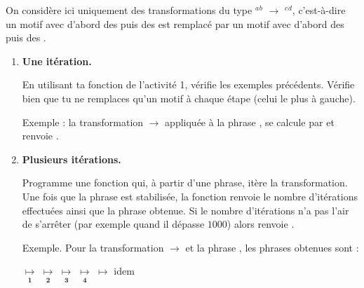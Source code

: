 \documentclass[11pt,class=report,crop=false]{standalone}
\begin{document}

\begin{activite}


On considère ici uniquement des transformations du type \rzero$^a$\run$^b$ $\rightarrow$ \run$^c$\rzero$^d$, c'est-à-dire un motif avec d'abord des \rzero{} puis des \run{} est remplacé par un motif avec d'abord des \run{} puis des \rzero.



\begin{enumerate}
  \item \textbf{Une itération.}
  
   En utilisant ta fonction  de l'activité 1, vérifie les exemples précédents. Vérifie bien que tu ne remplaces qu'un motif à chaque étape (celui le plus à gauche).
  
  Exemple : la transformation \rzero\run{} $\rightarrow$ \run\rzero{} appliquée à la phrase \run\rzero\run, se calcule par  et renvoie .
   
  \item \textbf{Plusieurs itérations.}
  
  
  Programme une fonction  qui, à partir d'une phrase, itère la transformation. Une fois que la phrase est stabilisée, la fonction renvoie le nombre d'itérations effectuées ainsi que la phrase obtenue. Si le nombre d'itérations n'a pas l'air de s'arrêter (par exemple quand il dépasse $1000$) alors renvoie .
  
  Exemple. Pour la transformation \rzero\rzero\run\run{} $\rightarrow$ \run\run\rzero\rzero{} et la phrase \rzero\rzero\rzero\rzero\run\run\rzero\run\run, les phrases obtenues sont : 
  
{\small
\centerline{
\rzero\rzero\rzero\rzero\run\run\rzero\run\run{}  $\underset{\mathbf{1}}{\longmapsto}$
\rzero\rzero\run\run\rzero\rzero\rzero\run\run{}  $\underset{\mathbf{2}}{\longmapsto}$
\run\run\rzero\rzero\rzero\rzero\rzero\run\run{}  $\underset{\mathbf{3}}{\longmapsto}$
\run\run\rzero\rzero\rzero\run\run\rzero\rzero{}  $\underset{\mathbf{4}}{\longmapsto}$
\run\run\rzero\run\run\rzero\rzero\rzero\rzero{}  $\longmapsto$
idem
}
}


\end{enumerate}
\end{activite}
\end{document}
